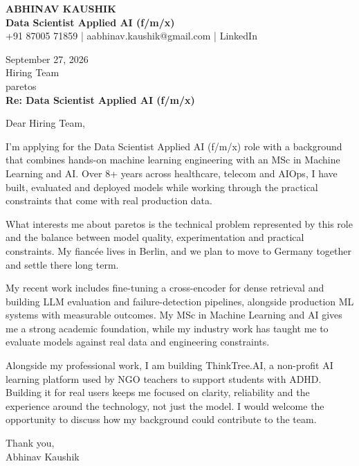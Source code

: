 \documentclass[10pt,a4paper]{article}
\begin{document}
\begin{center}
{\Large\bfseries ABHINAV KAUSHIK}\\[2pt]
{\bfseries Data Scientist Applied AI (f/m/x)}\\[2pt]
+91 87005 71859 \quad | \quad aabhinav.kaushik@gmail.com \quad | \quad LinkedIn
\end{center}
\vspace{8pt}
September 27, 2026\\[6pt]
Hiring Team\\
paretos\\[4pt]
\textbf{Re: Data Scientist Applied AI (f/m/x)}

Dear Hiring Team,

I’m applying for the Data Scientist Applied AI (f/m/x) role with a background that combines hands-on machine learning engineering with an MSc in Machine Learning and AI. Over 8+ years across healthcare, telecom and AIOps, I have built, evaluated and deployed models while working through the practical constraints that come with real production data.

What interests me about paretos is the technical problem represented by this role and the balance between model quality, experimentation and practical constraints. My fiancée lives in Berlin, and we plan to move to Germany together and settle there long term.

My recent work includes fine-tuning a cross-encoder for dense retrieval and building LLM evaluation and failure-detection pipelines, alongside production ML systems with measurable outcomes. My MSc in Machine Learning and AI gives me a strong academic foundation, while my industry work has taught me to evaluate models against real data and engineering constraints.

Alongside my professional work, I am building ThinkTree.AI, a non-profit AI learning platform used by NGO teachers to support students with ADHD. Building it for real users keeps me focused on clarity, reliability and the experience around the technology, not just the model. I would welcome the opportunity to discuss how my background could contribute to the team.

Thank you,\\
Abhinav Kaushik
\end{document}
